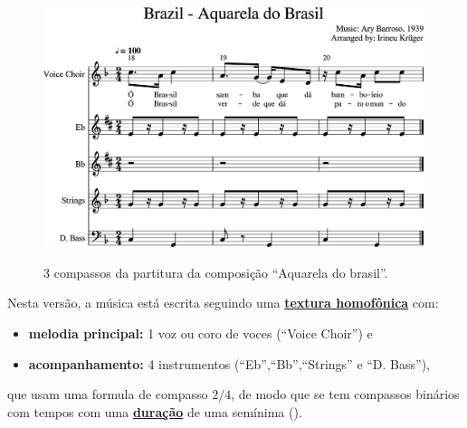 \begin{figure}[ht]
\centering
\href{https://drive.google.com/file/d/1RcUcWJlukxaF7nmDTKDxUZDR8sLH9QpC/view?usp=sharing}{\includegraphics[width=0.99\textwidth]{chapters/cap-musicalidade-percepcion/abc-aquarela-1.eps}}

\caption{3 compassos da partitura da composição ``Aquarela do brasil''.}
\label{fig:abc-caquarela}
\end{figure}

Nesta versão, a música está escrita seguindo uma 
\hyperref[subsec:homofonica]{\textbf{textura homofônica}} com:
\begin{itemize}
\item \textbf{melodia principal:} 1 voz ou coro de voces (``Voice Choir'') e  
\item \textbf{acompanhamento:} 4 instrumentos (``Eb'',``Bb'',``Strings'' e ``D. Bass''), 
\end{itemize}
que usam uma 
formula de compasso $2/4$, de modo que se tem compassos
binários com tempos com uma \hyperref[sec:pos:Duracion]{\textbf{duração}} de uma semínima (\quarternote).


